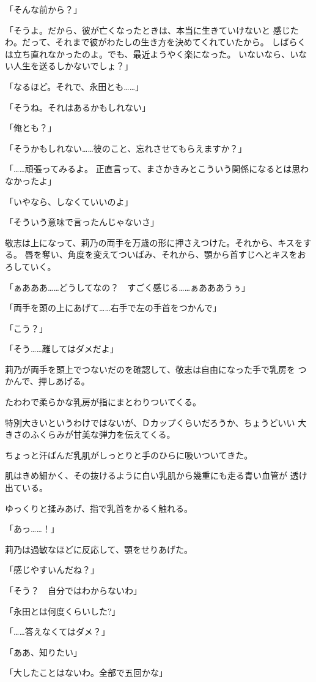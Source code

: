 ﻿\documentclass[
    book,tate,
    line_length=30zw,
    jafontsize=12pt,
    paper=b5j,
    landscape,
    ]{jlreq}
\begin{document}
「そんな前から？」

「そうよ。だから、彼が亡くなったときは、本当に生きていけないと
感じたわ。だって、それまで彼がわたしの生き方を決めてくれていたから。
しばらくは立ち直れなかったのよ。でも、最近ようやく楽になった。
いないなら、いない人生を送るしかないでしょ？」

「なるほど。それで、永田とも……」

「そうね。それはあるかもしれない」

「俺とも？」

「そうかもしれない……彼のこと、忘れさせてもらえますか？」

「……頑張ってみるよ。 正直言って、まさかきみとこういう関係になるとは思わなかったよ」

「いやなら、しなくていいのよ」

「そういう意味で言ったんじゃないさ」

敬志は上になって、莉乃の両手を万歳の形に押さえつけた。それから、キスをする。
唇を奪い、角度を変えてついばみ、それから、顎から首すじへとキスをおろしていく。

「ぁあああ……どうしてなの？　すごく感じる……ぁあああうぅ」

「両手を頭の上にあげて……右手で左の手首をつかんで」

「こう？」

「そう……離してはダメだよ」

莉乃が両手を頭上でつないだのを確認して、敬志は自由になった手で乳房を
つかんで、押しあげる。

たわわで柔らかな乳房が指にまとわりついてくる。

特別大きいというわけではないが、Ｄカップくらいだろうか、ちょうどいい
大きさのふくらみが甘美な弾力を伝えてくる。

ちょっと汗ばんだ乳肌がしっとりと手のひらに吸いついてきた。

肌はきめ細かく、その抜けるように白い乳肌から幾重にも走る青い血管が
透け出ている。

ゆっくりと揉みあげ、指で乳首をかるく触れる。

「あっ……！」

莉乃は過敏なほどに反応して、顎をせりあげた。

「感じやすいんだね？」

「そう？　自分ではわからないわ」

「永田とは何度くらいした?」

「……答えなくてはダメ？」

「ああ、知りたい」

「大したことはないわ。全部で五回かな」
\end{document}
